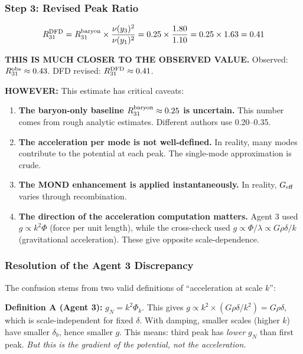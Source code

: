 \documentclass[11pt,a4paper]{article}
\begin{document}
\subsubsection{Step 3: Revised Peak Ratio}

\begin{equation}
R_{31}^{\rm DFD} = R_{31}^{\rm baryon} \times \frac{\nu(y_3)^2}{\nu(y_1)^2} = 0.25 \times \frac{1.80}{1.10} = 0.25 \times 1.63 = 0.41
\end{equation}

\textbf{THIS IS MUCH CLOSER TO THE OBSERVED VALUE.} Observed: $R_{31}^{\rm obs} \approx 0.43$. DFD revised: $R_{31}^{\rm DFD} \approx 0.41$.

\textbf{HOWEVER:} This estimate has critical caveats:

\begin{enumerate}
\item \textbf{The baryon-only baseline $R_{31}^{\rm baryon} \approx 0.25$ is uncertain.} This number comes from rough analytic estimates. Different authors use 0.20--0.35.

\item \textbf{The acceleration per mode is not well-defined.} In reality, many modes contribute to the potential at each peak. The single-mode approximation is crude.

\item \textbf{The MOND enhancement is applied instantaneously.} In reality, $G_{\rm eff}$ varies through recombination.

\item \textbf{The direction of the acceleration computation matters.} Agent 3 used $g \propto k^2\Phi$ (force per unit length), while the cross-check used $g \propto \Phi/\lambda \propto G\rho\delta/k$ (gravitational acceleration). These give opposite scale-dependence.
\end{enumerate}

\subsubsection{Resolution of the Agent 3 Discrepancy}

The confusion stems from two valid definitions of ``acceleration at scale $k$'':

\textbf{Definition A (Agent 3):} $g_N = k^2\Phi_k$. This gives $g \propto k^2 \times (G\rho\delta/k^2) = G\rho\delta$, which is scale-independent for fixed $\delta$. With damping, smaller scales (higher $k$) have smaller $\delta_b$, hence smaller $g$. This means: third peak has \emph{lower} $g_N$ than first peak. \emph{But this is the gradient of the potential, not the acceleration.}
\end{document}
